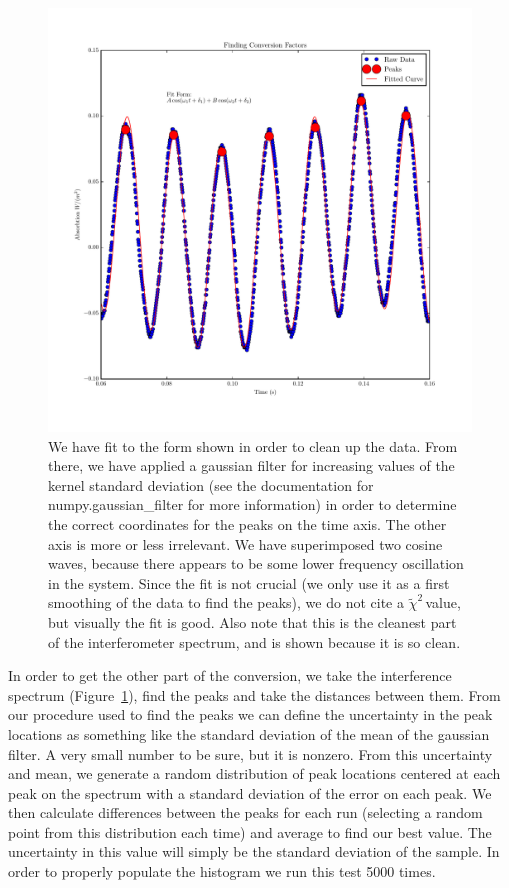 \documentclass{article}
\newcommand{\redchi}{$\tilde{\chi}^2\,$}
\begin{document}
  \begin{figure}
    \centering
    \includegraphics[scale=.75]{../plots/conversion.pdf}
    \caption{We have fit to the form shown in order to clean up the data.  From there, we have applied a gaussian filter for increasing values of the kernel standard deviation (see the documentation for numpy.gaussian\_filter for more information) in order to determine the correct coordinates for the peaks on the time axis.  The other axis is more or less irrelevant.  We have superimposed two cosine waves, because there appears to be some lower frequency oscillation in the system.  Since the fit is not crucial (we only use it as a first smoothing of the data to find the peaks), we do not cite a \redchi value, but visually the fit is good.  Also note that this is the cleanest part of the interferometer spectrum, and is shown because it is so clean.}
    \label{cal_graph}
  \end{figure}

  In order to get the other part of the conversion, we take the interference spectrum (Figure~\ref{cal_graph}), find the peaks and take the distances between them.  From our procedure used to find the peaks we can define the uncertainty in the peak locations as something like the standard deviation of the mean of the gaussian filter.  A very small number to be sure, but it is nonzero.  From this uncertainty and mean, we generate a random distribution of peak locations centered at each peak on the spectrum with a standard deviation of the error on each peak.  We then calculate differences between the peaks for each run (selecting a random point from this distribution each time) and average to find our best value.  The uncertainty in this value will simply be the standard deviation of the sample.  In order to properly populate the histogram we run this test 5000 times.
\end{document}
